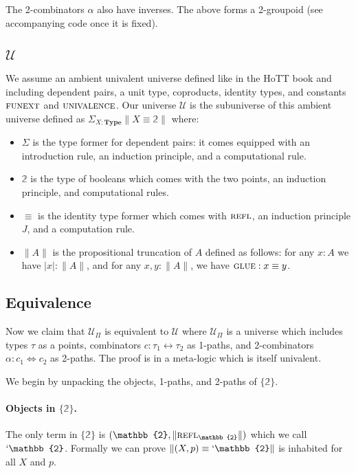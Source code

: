 \documentclass[format=acmlarge,review,natbib]{acmart}
\newcommand{\reflp}{\textsc{refl}}
\newcommand{\gluep}{\textsc{glue}}
\newcommand{\iso}{\leftrightarrow}
\newcommand{\isotwo}{\Leftrightarrow}
\newcommand{\bt}{\mathbb{2}}
\begin{document}
The 2-combinators $\alpha$ also have inverses. The above forms a 2-groupoid (see
accompanying code once it is fixed).

\subsection{$\mathcal{U}$}

We assume an ambient univalent universe defined like in the HoTT book and including dependent pairs, a unit type, coproducts, identity types, and constants $\textsc{funext}$ and $\textsc{univalence}$. Our universe $\mathcal{U}$ is the subuniverse of this ambient universe defined as $\Sigma_{X:\mathbf{Type}} \| X \equiv \bt \|$ where:

\begin{itemize}

\item $\Sigma$ is the type former for dependent pairs: it comes equipped with an introduction rule, an induction principle, and a computational rule.

\item $\bt$ is the type of booleans which comes with the two points, an induction principle, and computational rules.

\item $\equiv$ is the identity type former which comes with $\reflp$, an induction principle $J$, and a computation rule.

\item $\| A \|$ is the propositional truncation of $A$ defined as follows: for
  any $x:A$ we have $|x| : \|A\|$, and for any $x,y : \|A\|$, we have
  $\gluep : x \equiv y$.

\end{itemize}

\subsection{Equivalence}

Now we claim that $\mathcal{U}_\Pi$ is equivalent to $\mathcal{U}$ where
$\mathcal{U}_\Pi$ is a universe which includes types $\tau$ as a points,
combinators $c : \tau_1 \iso \tau_2$ as 1-paths, and 2-combinators
$\alpha : c_1 \isotwo c_2$ as 2-paths. The proof is in a meta-logic which is
itself univalent.

We begin by unpacking the objects, 1-paths, and 2-paths of $\{\bt\}$.

\paragraph*{Objects in $\{\bt\}$.} The only term in $\{\bt\}$ is
$(\bt,\|\reflp_{\bt}\|)$ which we call $`\bt$. Formally we can prove
$\|(X,p) \equiv `\bt\|$ is inhabited for all $X$ and $p$.
\end{document}
